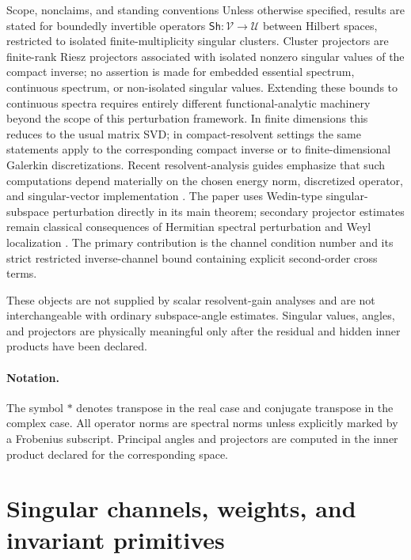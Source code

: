 \documentclass[review]{siamart220329}
\theoremstyle{definition}
\theoremstyle{remark}
\newcommand{\calU}{\mathcal{U}}
\newcommand{\calV}{\mathcal{V}}
\newcommand{\Sh}{\mathsf{Sh}}
\begin{document}
\begin{siambox}{Scope, nonclaims, and standing conventions}
Unless otherwise specified, results are stated for boundedly invertible operators $\Sh:\calV\to\calU$ between Hilbert spaces, restricted to isolated finite-multiplicity singular clusters. Cluster projectors are finite-rank Riesz projectors associated with isolated nonzero singular values of the compact inverse; no assertion is made for embedded essential spectrum, continuous spectrum, or non-isolated singular values. Extending these bounds to continuous spectra requires entirely different functional-analytic machinery beyond the scope of this perturbation framework. In finite dimensions this reduces to the usual matrix SVD; in compact-resolvent settings the same statements apply to the corresponding compact inverse or to finite-dimensional Galerkin discretizations. Recent resolvent-analysis guides emphasize that such computations depend materially on the chosen energy norm, discretized operator, and singular-vector implementation \cite{RolandiRibeiroYehTaira2024}. The paper uses Wedin-type singular-subspace perturbation directly in its main theorem; secondary projector estimates remain classical consequences of Hermitian spectral perturbation and Weyl localization \cite{DavisKahan1970,StewartSun1990}. The primary contribution is the channel condition number and its strict restricted inverse-channel bound containing explicit second-order cross terms.

These objects are not supplied by scalar resolvent-gain analyses and are not interchangeable with ordinary subspace-angle estimates. Singular values, angles, and projectors are physically meaningful only after the residual and hidden inner products have been declared.
\end{siambox}

\paragraph{Notation.}
The symbol $*$ denotes transpose in the real case and conjugate transpose in the complex case. All operator norms are spectral norms unless explicitly marked by a Frobenius subscript. Principal angles and projectors are computed in the inner product declared for the corresponding space.

\section{Singular channels, weights, and invariant primitives}\label{sec:primitives}
\end{document}

